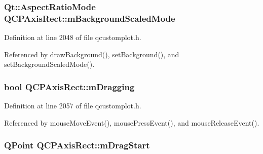 \hypertarget{class_q_c_p_axis_rect_a859fd368e794663e346b4f53f35078e9}{}
\subsubsection[{m\+Background\+Scaled\+Mode}]{\setlength{\rightskip}{0pt plus 5cm}Qt\+::\+Aspect\+Ratio\+Mode Q\+C\+P\+Axis\+Rect\+::m\+Background\+Scaled\+Mode\hspace{0.3cm}{\ttfamily [protected]}}\label{class_q_c_p_axis_rect_a859fd368e794663e346b4f53f35078e9}


Definition at line 2048 of file qcustomplot.\+h.



Referenced by draw\+Background(), set\+Background(), and set\+Background\+Scaled\+Mode().

\hypertarget{class_q_c_p_axis_rect_ab49a6698194cf0e9e38a1d734c0888a8}{}
\subsubsection[{m\+Dragging}]{\setlength{\rightskip}{0pt plus 5cm}bool Q\+C\+P\+Axis\+Rect\+::m\+Dragging\hspace{0.3cm}{\ttfamily [protected]}}\label{class_q_c_p_axis_rect_ab49a6698194cf0e9e38a1d734c0888a8}


Definition at line 2057 of file qcustomplot.\+h.



Referenced by mouse\+Move\+Event(), mouse\+Press\+Event(), and mouse\+Release\+Event().

\hypertarget{class_q_c_p_axis_rect_a032896b28f83a58010d8d533b78c49df}{}
\subsubsection[{m\+Drag\+Start}]{\setlength{\rightskip}{0pt plus 5cm}Q\+Point Q\+C\+P\+Axis\+Rect\+::m\+Drag\+Start\hspace{0.3cm}{\ttfamily [protected]}}\label{class_q_c_p_axis_rect_a032896b28f83a58010d8d533b78c49df}


